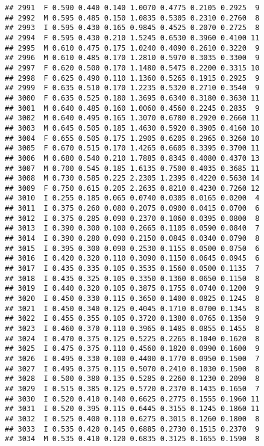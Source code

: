 \documentclass[
]{article}
\begin{document}
\begin{verbatim}
## 2991  F 0.590 0.440 0.140 1.0070 0.4775 0.2105 0.2925  9
## 2992  M 0.595 0.485 0.150 1.0835 0.5305 0.2310 0.2760  8
## 2993  I 0.595 0.430 0.165 0.9845 0.4525 0.2070 0.2725  8
## 2994  F 0.595 0.430 0.210 1.5245 0.6530 0.3960 0.4100 11
## 2995  M 0.610 0.475 0.175 1.0240 0.4090 0.2610 0.3220  9
## 2996  M 0.610 0.485 0.170 1.2810 0.5970 0.3035 0.3300  9
## 2997  F 0.620 0.500 0.170 1.1480 0.5475 0.2200 0.3315 10
## 2998  F 0.625 0.490 0.110 1.1360 0.5265 0.1915 0.2925  9
## 2999  F 0.635 0.510 0.170 1.2235 0.5320 0.2710 0.3540  9
## 3000  F 0.635 0.525 0.180 1.3695 0.6340 0.3180 0.3630 11
## 3001  M 0.640 0.485 0.160 1.0060 0.4560 0.2245 0.2835  9
## 3002  M 0.640 0.495 0.165 1.3070 0.6780 0.2920 0.2660 11
## 3003  M 0.645 0.505 0.185 1.4630 0.5920 0.3905 0.4160 10
## 3004  F 0.655 0.505 0.175 1.2905 0.6205 0.2965 0.3260 10
## 3005  F 0.670 0.515 0.170 1.4265 0.6605 0.3395 0.3700 11
## 3006  M 0.680 0.540 0.210 1.7885 0.8345 0.4080 0.4370 13
## 3007  M 0.700 0.545 0.185 1.6135 0.7500 0.4035 0.3685 11
## 3008  M 0.730 0.585 0.225 2.2305 1.2395 0.4220 0.5630 14
## 3009  F 0.750 0.615 0.205 2.2635 0.8210 0.4230 0.7260 12
## 3010  I 0.255 0.185 0.065 0.0740 0.0305 0.0165 0.0200  4
## 3011  I 0.375 0.260 0.080 0.2075 0.0900 0.0415 0.0700  6
## 3012  I 0.375 0.285 0.090 0.2370 0.1060 0.0395 0.0800  8
## 3013  I 0.390 0.300 0.100 0.2665 0.1105 0.0590 0.0840  7
## 3014  I 0.390 0.280 0.090 0.2150 0.0845 0.0340 0.0790  8
## 3015  I 0.395 0.300 0.090 0.2530 0.1155 0.0500 0.0750  6
## 3016  I 0.420 0.320 0.110 0.3090 0.1150 0.0645 0.0945  6
## 3017  I 0.435 0.335 0.105 0.3535 0.1560 0.0500 0.1135  7
## 3018  I 0.435 0.325 0.105 0.3350 0.1360 0.0650 0.1150  8
## 3019  I 0.440 0.320 0.105 0.3875 0.1755 0.0740 0.1200  9
## 3020  I 0.450 0.330 0.115 0.3650 0.1400 0.0825 0.1245  8
## 3021  I 0.450 0.340 0.125 0.4045 0.1710 0.0700 0.1345  8
## 3022  I 0.455 0.355 0.105 0.3720 0.1380 0.0765 0.1350  9
## 3023  I 0.460 0.370 0.110 0.3965 0.1485 0.0855 0.1455  8
## 3024  I 0.470 0.375 0.125 0.5225 0.2265 0.1040 0.1620  8
## 3025  I 0.475 0.375 0.110 0.4560 0.1820 0.0990 0.1600  9
## 3026  I 0.495 0.330 0.100 0.4400 0.1770 0.0950 0.1500  7
## 3027  I 0.495 0.375 0.115 0.5070 0.2410 0.1030 0.1500  8
## 3028  I 0.500 0.380 0.135 0.5285 0.2260 0.1230 0.2090  8
## 3029  I 0.515 0.385 0.125 0.5720 0.2370 0.1435 0.1650  7
## 3030  I 0.520 0.410 0.140 0.6625 0.2775 0.1555 0.1960 11
## 3031  I 0.520 0.395 0.115 0.6445 0.3155 0.1245 0.1860 11
## 3032  I 0.525 0.400 0.110 0.6275 0.3015 0.1260 0.1800  8
## 3033  I 0.535 0.420 0.145 0.6885 0.2730 0.1515 0.2370  9
## 3034  M 0.535 0.410 0.120 0.6835 0.3125 0.1655 0.1590  8

\end{verbatim}
\end{document}

